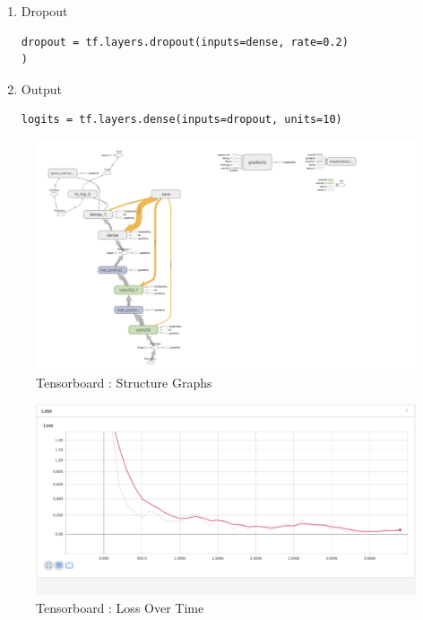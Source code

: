 \documentclass[12pt]{article}
\begin{document}
\begin{enumerate}
\item
Dropout
\begin{lstlisting}[style=PyStyle]
    dropout = tf.layers.dropout(inputs=dense, rate=0.2)
)    
\end{lstlisting}

\item
Output
\begin{lstlisting}[style=PyStyle]
    logits = tf.layers.dense(inputs=dropout, units=10)
\end{lstlisting}







\end{enumerate}

\newpage

\begin{figure}
  \includegraphics[width=\linewidth]{Graphs.png}
  \caption{Tensorboard : Structure Graphs}
  \label{fig:boat1}
\end{figure}
 

\begin{figure}
  \includegraphics[width=\linewidth]{Loss.png}
  \caption{Tensorboard : Loss Over Time}
  \label{fig:boat1}
\end{figure}
\end{document}
